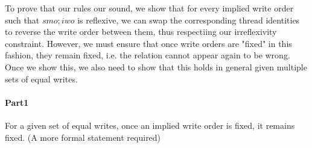         To prove that our rules our sound, we show that for every implied write order such that $smo;iwo$ is reflexive, we can swap the corresponding thread identities to reverse the write order between them, thus respectiing our irreflexivity constraint. However, we must ensure that once write orders are "fixed" in this fashion, they remain fixed, i.e. the relation cannot appear again to be wrong. Once we show this, we also need to show that this holds in general given multiple sets of equal writes. 
        
        \paragraph{Part1}
            For a given set of equal writes, once an implied write order is fixed, it remains fixed. 
            (A more formal statement required)
